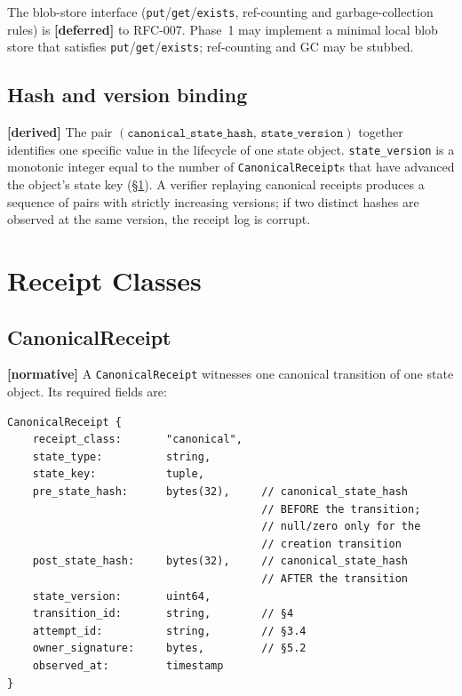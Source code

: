 \documentclass[11pt,a4paper]{article}
\newcommand{\normsv}{\textcolor{normativecolor}{\textbf{[normative]}}\xspace}
\newcommand{\derived}{\textcolor{derivedcolor}{\textbf{[derived]}}\xspace}
\newcommand{\deferred}{\textcolor{deferredcolor}{\textbf{[deferred]}}\xspace}
\theoremstyle{definition}
\begin{document}
\begin{notebox}
The blob-store interface (\texttt{put}/\texttt{get}/\texttt{exists},
ref-counting and garbage-collection rules) is \deferred{} to
RFC-007. Phase~1 may implement a minimal local blob store that
satisfies \texttt{put}/\texttt{get}/\texttt{exists}; ref-counting
and GC may be stubbed.
\end{notebox}

\subsection{Hash and version binding}

\derived{} The pair $(\texttt{canonical\_state\_hash},\,
\texttt{state\_version})$ together identifies one specific value
in the lifecycle of one state object. \texttt{state\_version} is a
monotonic integer equal to the number of \texttt{CanonicalReceipt}s
that have advanced the object's state key
(\S\ref{sec:receipt-classes}). A verifier replaying canonical
receipts produces a sequence of pairs with strictly increasing
versions; if two distinct hashes are observed at the same version,
the receipt log is corrupt.

\section{Receipt Classes}
\label{sec:receipt-classes}

\subsection{CanonicalReceipt}

\normsv{}
A \texttt{CanonicalReceipt} witnesses one canonical transition of
one state object. Its required fields are:

\begin{lstlisting}
CanonicalReceipt {
    receipt_class:       "canonical",
    state_type:          string,
    state_key:           tuple,
    pre_state_hash:      bytes(32),     // canonical_state_hash
                                        // BEFORE the transition;
                                        // null/zero only for the
                                        // creation transition
    post_state_hash:     bytes(32),     // canonical_state_hash
                                        // AFTER the transition
    state_version:       uint64,
    transition_id:       string,        // §4
    attempt_id:          string,        // §3.4
    owner_signature:     bytes,         // §5.2
    observed_at:         timestamp
}
\end{lstlisting}
\end{document}
